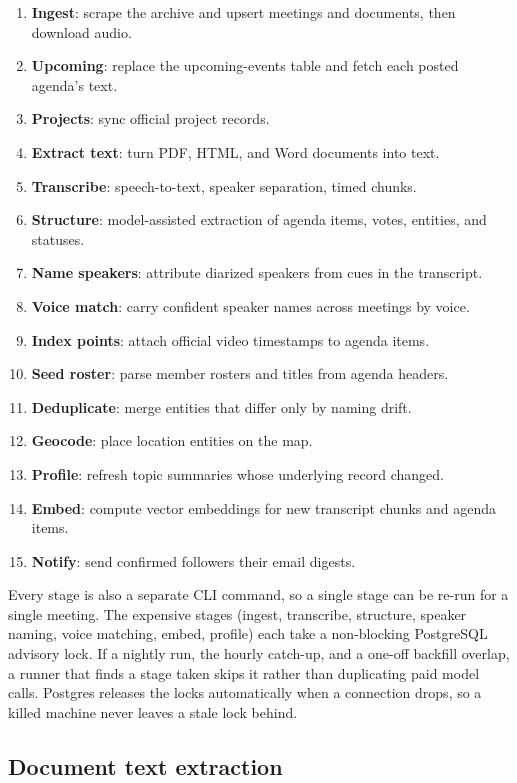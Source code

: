 \documentclass[11pt]{article}
\begin{document}
\begin{enumerate}[label=\arabic*.]
  \item \textbf{Ingest}: scrape the archive and upsert meetings and documents, then download audio.
  \item \textbf{Upcoming}: replace the upcoming-events table and fetch each posted agenda's text.
  \item \textbf{Projects}: sync official project records.
  \item \textbf{Extract text}: turn PDF, HTML, and Word documents into text.
  \item \textbf{Transcribe}: speech-to-text, speaker separation, timed chunks.
  \item \textbf{Structure}: model-assisted extraction of agenda items, votes, entities, and statuses.
  \item \textbf{Name speakers}: attribute diarized speakers from cues in the transcript.
  \item \textbf{Voice match}: carry confident speaker names across meetings by voice.
  \item \textbf{Index points}: attach official video timestamps to agenda items.
  \item \textbf{Seed roster}: parse member rosters and titles from agenda headers.
  \item \textbf{Deduplicate}: merge entities that differ only by naming drift.
  \item \textbf{Geocode}: place location entities on the map.
  \item \textbf{Profile}: refresh topic summaries whose underlying record changed.
  \item \textbf{Embed}: compute vector embeddings for new transcript chunks and agenda items.
  \item \textbf{Notify}: send confirmed followers their email digests.
\end{enumerate}

Every stage is also a separate CLI command, so a single stage can be re-run for a
single meeting. The expensive stages (ingest, transcribe, structure, speaker naming,
voice matching, embed, profile) each take a non-blocking PostgreSQL advisory lock. If a
nightly run, the hourly catch-up, and a one-off backfill overlap, a runner that finds a
stage taken skips it rather than duplicating paid model calls. Postgres releases the
locks automatically when a connection drops, so a killed machine never leaves a stale
lock behind.

\subsection{Document text extraction}
\end{document}
